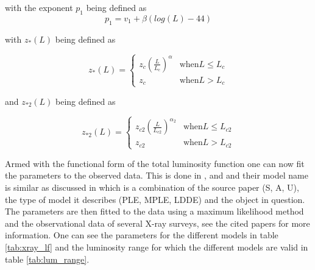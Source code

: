 with the exponent $p_1$ being defined as
\begin{equation}
    p_1 = v_1 + \beta(log(L)-44)
\end{equation}

with $z_{*}(L)$ being defined as

\begin{equation}
    z_*(L) = 
    \begin{cases} 
        z_c \left( \frac{L}{L_c} \right)^\alpha & \text{when} L \leq L_c \\
        z_c & \text{when} L > L_c 
    \end{cases}
\end{equation}


and $z_{*2}(L)$ being defined as

\begin{equation}
    z_{*2}(L) =
    \begin{cases}
        z_{c2} \left( \frac{L}{L_{c2}} \right)^{\alpha_2} & \text{when} L \leq L_{c2} \\
        z_{c2} & \text{when} L > L_{c2}
    \end{cases}
\end{equation}



Armed with the functional form of the total luminosity function one can now fit the parameters to the observed data. This is done in \cite{Silverman_2008}, \cite{Ajello_2009} and \cite{Ueda_2014} and their 
model name is similar as discussed in \cite{Jacobsen:2015mga} which is a combination of the source paper (S, A, U), the type of model it describes (PLE, MPLE, LDDE) and the object in question. The parameters are then fitted to the data using a maximum likelihood method and the observational data of several X-ray surveys, see the cited papers for more information.
One can see the parameters for the different models in table \ref{tab:xray_lf} and the luminosity range for which the different models are valid in table \ref{tab:lum_range}. 
